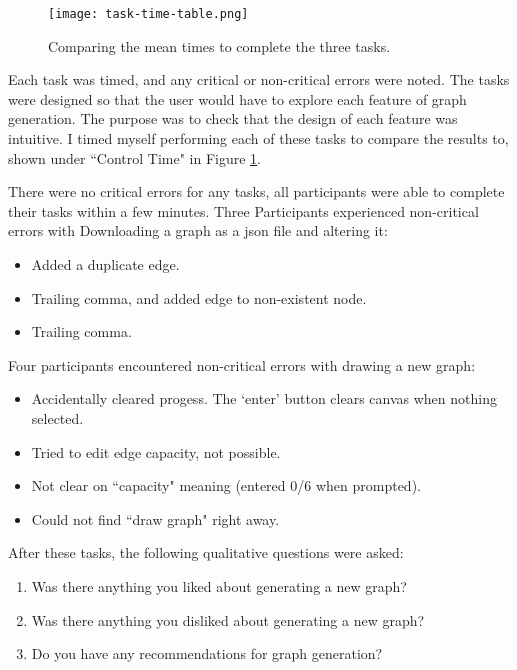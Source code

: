 \documentclass{l4proj}
\begin{document}
\begin{figure}[h]
    \centering
    \texttt{[image: task-time-table.png]}
    \caption{Comparing the mean times to complete the three tasks.}
    \label{fig:timed-tasks}
\end{figure}

Each task was timed, and any critical or non-critical errors were noted. The tasks were designed so that the user would have to explore each feature of graph generation. The purpose was to check that the design of each feature was intuitive. I timed myself performing each of these tasks to compare the results to, shown under ``Control Time" in Figure \ref{fig:timed-tasks}.

There were no critical errors for any tasks, all participants were able to complete their tasks within a few minutes. Three Participants experienced non-critical errors with Downloading a graph as a json file and altering it:

\begin{itemize}[noitemsep]
    \item Added a duplicate edge.
    \item Trailing comma, and added edge to non-existent node.
    \item Trailing comma.
\end{itemize}

Four participants encountered non-critical errors with drawing a new graph:

\begin{itemize}[noitemsep]
    \item Accidentally cleared progess. The `enter' button clears canvas when nothing selected.
    \item Tried to edit edge capacity, not possible.
    \item Not clear on ``capacity" meaning (entered 0/6 when prompted).
    \item Could not find ``draw graph" right away.
\end{itemize}

After these tasks, the following qualitative questions were asked:
\begin{enumerate}[noitemsep]
    \item Was there anything you liked about generating a new graph?
    \item Was there anything you disliked about generating a new graph?
    \item Do you have any recommendations for graph generation?
\end{enumerate}
\end{document}
